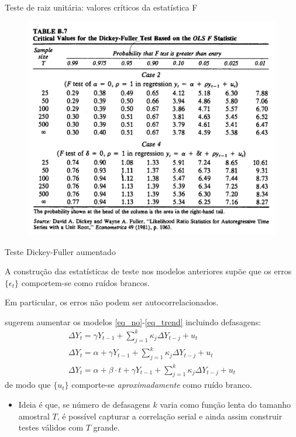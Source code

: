 \documentclass[11pt]{beamer}
\newenvironment{halfwideitemize}{\itemize\addtolength{\itemsep}{0.5em}}{\enditemize}
\begin{document}
\begin{frame}{Teste de raiz unitária: valores críticos da estatística F}
	\begin{figure}
		\includegraphics[scale=0.5]{graficos/valores_criticos_F.png}
	\end{figure}
\end{frame}

\begin{frame}{Teste Dickey-Fuller aumentado}
	\begin{halfwideitemize}
		\item A construção das estatísticas de teste nos modelos anteriores supõe que os erros $\{\epsilon_t\}$ comportem-se como ruídos brancos.
		\begin{halfwideitemize}
			\item Em particular, os erros não podem ser autocorrelacionados. 
		\end{halfwideitemize}
		\item \citet{Said1984} sugerem aumentar os modelos \eqref{eq_no}-\eqref{eq_trend} incluindo defasagens:
		\begin{equation}
			\label{eq_full}
			\begin{aligned}
				\Delta Y_t = \gamma Y_{t-1}  +\sum_{j=1}^k \kappa_j \Delta Y_{t-j} + u_t \\
				\Delta Y_t = \alpha + \gamma Y_{t-1}  +\sum_{j=1}^k \kappa_j \Delta Y_{t-j} + u_t
				\\
				\Delta Y_t = \alpha + \beta \cdot t + \gamma Y_{t-1} +  \sum_{j=1}^k\kappa_j \Delta Y_{t-j} + u_t
			\end{aligned}
		\end{equation}
		de modo que $\{u_t\}$ comporte-se \emph{aproximadamente} como ruído branco.
		\begin{itemize}
			\item Ideia é que, se número de defasagens $k$ varia como função lenta do tamanho amostral $T$, é possível capturar a correlação serial e ainda assim construir testes válidos com $T$ grande. 
		\end{itemize}
		
	\end{halfwideitemize}
\end{frame}
\end{document}
